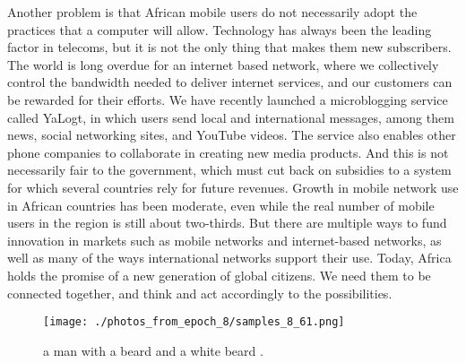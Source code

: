 \documentclass{article}%
\begin{document}
Another problem is that African mobile users do not necessarily adopt the practices that a computer will allow. Technology has always been the leading factor in telecoms, but it is not the only thing that makes them new subscribers. The world is long overdue for an internet based network, where we collectively control the bandwidth needed to deliver internet services, and our customers can be rewarded for their efforts.\newline%
We have recently launched a microblogging service called YaLogt, in which users send local and international messages, among them news, social networking sites, and YouTube videos. The service also enables other phone companies to collaborate in creating new media products. And this is not necessarily fair to the government, which must cut back on subsidies to a system for which several countries rely for future revenues.\newline%
Growth in mobile network use in African countries has been moderate, even while the real number of mobile users in the region is still about two{-}thirds. But there are multiple ways to fund innovation in markets such as mobile networks and internet{-}based networks, as well as many of the ways international networks support their use.\newline%
Today, Africa holds the promise of a new generation of global citizens. We need them to be connected together, and think and act accordingly to the possibilities.\newline%

%


\begin{figure}[h!]%
\centering%
\texttt{[image: ./photos\_from\_epoch\_8/samples\_8\_61.png]}%
\caption{a man with a beard and a white beard .}%
\end{figure}

%
\end{document}

